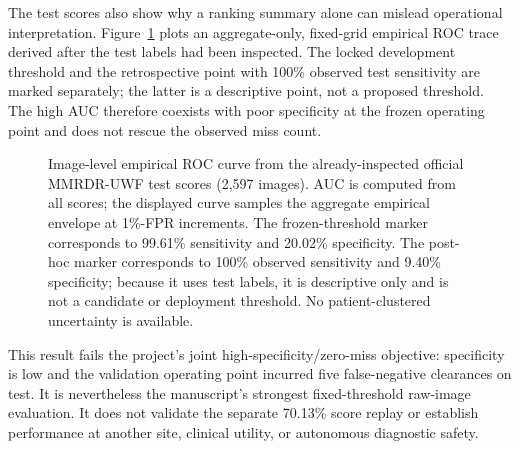 \documentclass[11pt]{article}
\begin{document}
The test scores also show why a ranking summary alone can mislead operational interpretation. Figure~\ref{fig:mmrdr-roc} plots an aggregate-only, fixed-grid empirical ROC trace derived after the test labels had been inspected. The locked development threshold and the retrospective point with 100\% observed test sensitivity are marked separately; the latter is a descriptive point, not a proposed threshold. The high AUC therefore coexists with poor specificity at the frozen operating point and does not rescue the observed miss count.

\begin{figure}[t]
\centering
{}
\caption{Image-level empirical ROC curve from the already-inspected official MMRDR-UWF test scores (2,597 images). AUC is computed from all scores; the displayed curve samples the aggregate empirical envelope at 1\%-FPR increments. The frozen-threshold marker corresponds to 99.61\% sensitivity and 20.02\% specificity. The post-hoc marker corresponds to 100\% observed sensitivity and 9.40\% specificity; because it uses test labels, it is descriptive only and is not a candidate or deployment threshold. No patient-clustered uncertainty is available.}
\label{fig:mmrdr-roc}
\end{figure}

This result fails the project's joint high-specificity/zero-miss objective: specificity is low and the validation operating point incurred five false-negative clearances on test. It is nevertheless the manuscript's strongest fixed-threshold raw-image evaluation. It does not validate the separate 70.13\% score replay or establish performance at another site, clinical utility, or autonomous diagnostic safety.
\end{document}
